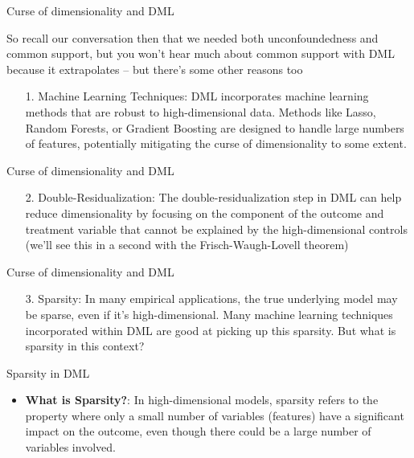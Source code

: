\documentclass{beamer}
\begin{document}
\begin{frame}{Curse of dimensionality and DML}

So recall our conversation then that we needed both unconfoundedness and common support, but you won't hear much about common support with DML because it extrapolates -- but there's some other reasons too

\begin{enumerate}
\item[1. ] Machine Learning Techniques: DML  incorporates machine learning methods that are robust to high-dimensional data. Methods like Lasso, Random Forests, or Gradient Boosting are designed to handle large numbers of features, potentially mitigating the curse of dimensionality to some extent.



\end{enumerate}

\end{frame}

\begin{frame}{Curse of dimensionality and DML}

\begin{enumerate}

\item[2. ] Double-Residualization: The double-residualization step in DML can help reduce dimensionality by focusing on the component of the outcome and treatment variable that cannot be explained by the high-dimensional controls (we'll see this in a second with the Frisch-Waugh-Lovell theorem)


\end{enumerate}

\end{frame}


\begin{frame}{Curse of dimensionality and DML}


\begin{enumerate}

\item[3. ] Sparsity: In many empirical applications, the true underlying model may be sparse, even if it's high-dimensional. Many machine learning techniques incorporated within DML are good at picking up this sparsity.  But what is sparsity in this context?

\end{enumerate}

\end{frame}

\begin{frame}{Sparsity in DML}

\begin{itemize}
\item \textbf{What is Sparsity?}: In high-dimensional models, sparsity refers to the property where only a small number of variables (features) have a significant impact on the outcome, even though there could be a large number of variables involved.

\end{itemize}

\end{frame}
\end{document}
